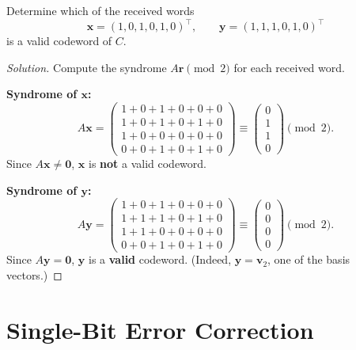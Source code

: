 \begin{example}
Determine which of the received words
\[
    \mathbf{x} = (1,0,1,0,1,0)^{\top}, \qquad \mathbf{y} = (1,1,1,0,1,0)^{\top}
\]
is a valid codeword of $C$.
\end{example}

\begin{proof}[Solution]
Compute the syndrome $A\mathbf{r} \pmod{2}$ for each received word.

\textbf{Syndrome of $\mathbf{x}$:}
\[
    A\mathbf{x} =
    \begin{pmatrix}
        1{+}0{+}1{+}0{+}0{+}0\\
        1{+}0{+}1{+}0{+}1{+}0\\
        1{+}0{+}0{+}0{+}0{+}0\\
        0{+}0{+}1{+}0{+}1{+}0
    \end{pmatrix}
    \equiv
    \begin{pmatrix}0\\1\\1\\0\end{pmatrix} \pmod{2}.
\]
Since $A\mathbf{x} \neq \mathbf{0}$, $\mathbf{x}$ is \textbf{not} a valid codeword.

\medskip
\textbf{Syndrome of $\mathbf{y}$:}
\[
    A\mathbf{y} =
    \begin{pmatrix}
        1{+}0{+}1{+}0{+}0{+}0\\
        1{+}1{+}1{+}0{+}1{+}0\\
        1{+}1{+}0{+}0{+}0{+}0\\
        0{+}0{+}1{+}0{+}1{+}0
    \end{pmatrix}
    \equiv
    \begin{pmatrix}0\\0\\0\\0\end{pmatrix} \pmod{2}.
\]
Since $A\mathbf{y} = \mathbf{0}$, $\mathbf{y}$ is a \textbf{valid} codeword.
(Indeed, $\mathbf{y} = \mathbf{v}_2$, one of the basis vectors.)
\end{proof}

\section{Single-Bit Error Correction}


